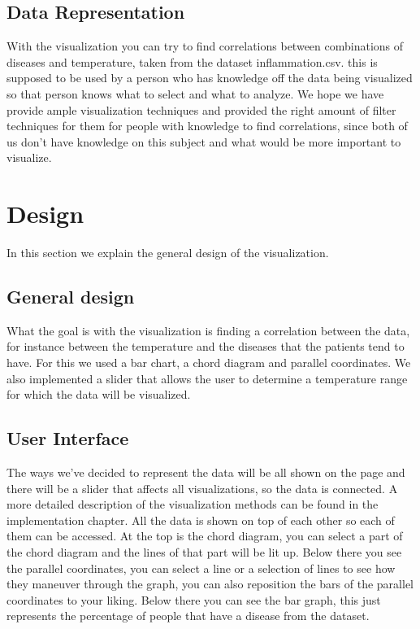 \documentclass[a4paper,twoside,11pt]{article}
\begin{document}
\subsection{Data Representation}
With the visualization you can try to find correlations between combinations of diseases and temperature, taken from the dataset inflammation.csv. this is supposed to be used by a person who has knowledge off the data being visualized so that person knows what to select and what to analyze. We hope we have provide ample visualization techniques and provided the right amount of filter techniques for them for people with knowledge to find correlations, since both of us don't have knowledge on this subject and what would be more important to visualize.
\newpage
\section{Design}
In this section we explain the general design of the visualization.
\subsection{General design}
What the goal is with the visualization is finding a correlation between the data, for instance between the temperature and the diseases that the patients tend to have. For this we used a bar chart, a chord diagram and parallel coordinates. We also implemented a slider that allows the user to determine a temperature range for which the data will be visualized.
\subsection{User Interface}
The ways we've decided to represent the data will be all shown on the page and there will be a slider that affects all visualizations, so the data is connected. A more detailed description of the visualization methods can be found in the implementation chapter. \newline
All the data is shown on top of each other so each of them can be accessed. At the top is the chord diagram, you can select a part of the chord diagram and the lines of that part will be lit up. Below there you see the parallel coordinates, you can select a line or a selection of lines to see how they maneuver through the graph, you can also reposition the bars of the parallel coordinates to your liking. Below there you can see the bar graph, this just represents the percentage of people that have a disease from the dataset.
\newpage
\end{document}
